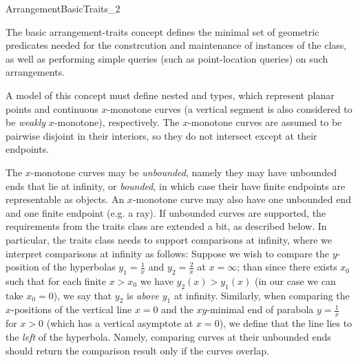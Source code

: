 
\ccRefPageBegin

\begin{ccRefConcept}{ArrangementBasicTraits_2}

\ccDefinition

The basic arrangement-traits concept defines the minimal set of geometric
predicates needed for the constrcution and maintenance of instances of the
 class, as well as performing simple queries (such as
point-location queries) on such arrangements.

A model of this concept must define nested  and
 types, which represent planar points and
continuous $x$-monotone curves (a vertical segment is also considered to be
{\sl weakly} $x$-monotone), respectively. The $x$-monotone curves are assumed
to be pairwise disjoint in their interiors, so they do not intersect
except at their endpoints.

The $x$-monotone curves may be {\em unbounded}, namely they may have unbounded
ends that lie at infinity, or {\em bounded}, in which case their have finite
endpoints are representable as  objects. An $x$-monotone curve
may also have one unbounded end and one finite endpoint (e.g. a ray).
If unbounded curves are supported, the requirements from the traits class
are extended a bit, as described below. In particular, the traits class needs
to support comparisons at infinity, where we interpret comparisons at infinity
as follows: Suppose we wish to compare the $y$-position of the hyperbolas
$y_1 = \frac{1}{x}$ and $y_2 = \frac{2}{x}$ at $x = \infty$; than since there
exists $x_0$ such that for each finite $x > x_0$ we have $y_2(x) > y_1(x)$
(in our case we can take $x_0 = 0$), we say that $y_2$ is {\em above} $y_1$ at
infinity. Similarly, when comparing the $x$-positions of the vertical line
$x = 0$ and the $xy$-minimal end of parabola $y = \frac{1}{x}$ for $x > 0$
(which has a vertical asymptote at $x = 0$), we define that the line lies to
the {\em left} of the hyperbola. Namely, comparing curves at their unbounded
ends should return the comparison result  only if the curves
overlap.

\ccTypes


\end{ccRefConcept}
